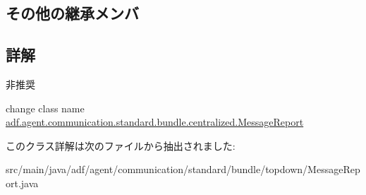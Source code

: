 \subsection*{その他の継承メンバ}


\subsection{詳解}
\begin{DoxyRefDesc}{非推奨}
\item[\hyperlink{deprecated__deprecated000005}{非推奨}]change class name \hyperlink{classadf_1_1agent_1_1communication_1_1standard_1_1bundle_1_1centralized_1_1MessageReport}{adf.\+agent.\+communication.\+standard.\+bundle.\+centralized.\+Message\+Report} \end{DoxyRefDesc}


このクラス詳解は次のファイルから抽出されました\+:\begin{DoxyCompactItemize}
\item 
src/main/java/adf/agent/communication/standard/bundle/topdown/Message\+Report.\+java\end{DoxyCompactItemize}
